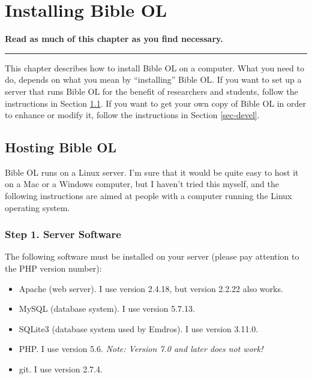 \documentclass[11pt,oneside,a4paper]{memoir}
\begin{document}
\chapter{Installing Bible OL}\label{chap-install}

\textbf{Read as much of this chapter as you find necessary.}
\plainbreak{3}

This chapter describes how to install Bible OL on a computer. What you need to do, depends on what
you mean by ``installing'' Bible OL. If you want to set up a server that runs Bible OL for the
benefit of researchers and students, follow the instructions in Section \ref{sec-host}.
If you want to get your own copy of Bible OL in order to enhance or modify it, follow the
instructions in Section \ref{sec-devel}.


\section{Hosting Bible OL}\label{sec-host}

Bible OL runs on a Linux server. I'm sure that it would be quite easy to host it on a
Mac or a Windows computer, but I haven't tried this myself, and the
following instructions are aimed at people with a computer running the Linux operating system.

\subsection{Step 1. Server Software}

The following software must be installed on your server (please pay attention to the PHP version number):

\begin{itemize}
\item Apache (web server). I use version 2.4.18, but version 2.2.22 also works.
\item MySQL (database system). I use version 5.7.13.
\item SQLite3 (database system used by Emdros). I use version 3.11.0.
\item PHP. I use version 5.6. \emph{Note: Version 7.0 and later does not work!}
\item git. I use version 2.7.4.
\end{itemize}
\end{document}
